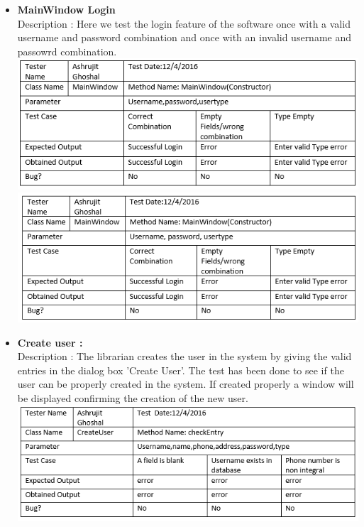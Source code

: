 \documentclass{article}
\begin{document}
\begin{itemize}
	
	\item \textbf{MainWindow Login} \\
	Description : Here we test the login feature of the software once with a valid username and password combination and once with an invalid username and passowrd combination.\\
	\includegraphics[scale=0.8]{images/Tables/MainWindow.PNG}\\
	
	\includegraphics[scale=0.8]{images/Tables/MainWindow1.PNG}
	
	
	\item \textbf{Create user :} \\
	Description : The librarian creates the user in the system by giving the valid entries in the dialog box 'Create User'. The test has been done to see if the user can be properly created in the system. If created properly a window will be displayed confirming the creation of the new user.\\
	\includegraphics[scale=0.8]{images/Tables/CreateUser.PNG}
	

\end{itemize}
\end{document}
